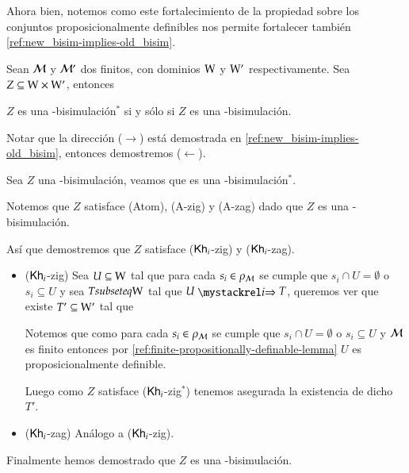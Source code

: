 Ahora bien, notemos como este fortalecimiento de la propiedad sobre los conjuntos proposicionalmente definibles nos permite fortalecer también \ref{ref:new_bisim-implies-old_bisim}.

\begin{lema}\label{ref:finite-old_bisim-implies-new_bisim}
    Sean $\mathcal{M}$ y $\mathcal{M}'$ dos \ultss finitos, con dominios $\mathrm{W}$ y $\mathrm{W}'$ respectivamente. Sea $Z \subseteq \mathrm{W} \times \mathrm{W}'$, entonces 
    \begin{center}
        $Z$ es una \KHilogic-bisimulación$^*$ si y sólo si $Z$ es una \KHilogic-bisimulación.
    \end{center}
\end{lema}

\begin{demostracion}
    Notar que la dirección ($\rightarrow$) está demostrada en \ref{ref:new_bisim-implies-old_bisim}, entonces demostremos ($\leftarrow$).
    
    Sea $Z$ una \KHilogic-bisimulación, veamos que es una \KHilogic-bisimulación$^*$.

    Notemos que $Z$ satisface (Atom), (A-zig) y (A-zag) dado que $Z$ es una \KHilogic-bisimulación.

    Así que demostremos que $Z$ satisface ($\mathsf{Kh}_i$-zig) y ($\mathsf{Kh}_i$-zag).

    \begin{itemize}
        \item ($\mathsf{Kh}_i$-zig) Sea $U \subseteq \mathrm{W}$ tal que para cada $s_i \in \rho_{\mathcal{M}}$ se cumple que $s_i \cap U = \emptyset$ o $s_i \subseteq U$ 
        y sea $T subseteq \mathrm{W}$ tal que $U \ultsExecAgi T$, queremos ver que existe $T' \subseteq \mathrm{W}'$ tal que

        \begin{multicols}{2}
        \end{multicols}

        Notemos que como para cada $s_i \in \rho_{\mathcal{M}}$ se cumple que $s_i \cap U = \emptyset$ o $s_i \subseteq U$ y $\mathcal{M}$ es finito entonces 
        por \ref{ref:finite-propositionally-definable-lemma} $U$ es proposicionalmente definible.
    
        Luego como $Z$ satisface ($\mathsf{Kh}_i$-zig$^*$) tenemos asegurada la existencia de dicho $T'$.
    
        \item ($\mathsf{Kh}_i$-zag) Análogo a ($\mathsf{Kh}_i$-zig). 
    \end{itemize}

    Finalmente hemos demostrado que $Z$ es una \KHilogic-bisimulación.
\end{demostracion}

